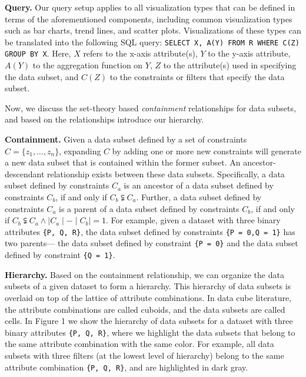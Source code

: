 \textbf{Query.} Our query setup applies to all visualization types that can be defined in terms of the aforementioned components, including common visualization types such as bar charts, trend lines, and scatter plots. Visualizations of these types can be translated into the following \textsc{SQL} query: {\tt SELECT X, A(Y) FROM R WHERE C(Z) GROUP BY X}. Here, $X$ refers to the x-axis attribute(s), $Y$ to the y-axis attribute, $A(Y)$ to the aggregation function on $Y$, $Z$ to the attribute(s) used in specifying the data subset, and $C(Z)$ to the constraints or filters that specify the data subset.

Now, we discuss the set-theory based \emph{containment} relationships for data subsets, and based on the relationships introduce our hierarchy.

\textbf{Containment.} Given a data subset defined by a set of constraints $C = \{z_1, \ldots, z_n\}$, expanding $C$ by adding one or more new constraints will generate a new data subset that is contained within the former subset. An ancestor-descendant relationship exists between these data subsets. Specifically, a data subset defined by constraints $C_a$ is an ancestor of a data subset defined by constraints $C_b$, if and only if $C_b \subsetneqq C_a$. Further, a data subset defined by constraints $C_a$ is a parent of a data subset defined by constraints $C_b$, if and only if $C_b \subsetneqq C_a \land \mid C_a \mid - \mid C_b \mid = 1$. For example, given a dataset with three binary attributes {\tt \{P, Q, R\}}, the data subset defined by constraints {\tt \{P = 0,Q = 1\}} has two parents--- the data subset defined by constraint {\tt \{P = 0\}} and the data subset defined by constraint {\tt \{Q = 1\}}.

\textbf{Hierarchy.} Based on the containment relationship, we can organize the data subsets of a given dataset to form a hierarchy. This hierarchy of data subsets is overlaid on top of the lattice of attribute combinations. In data cube literature, the attribute combinations are called cuboids, and the data subsets are called cells. In Figure 1 we show the hierarchy of data subsets for a dataset with three binary attributes {\tt \{P, Q, R\}}, where we highlight the data subsets that belong to the same attribute combination with the same color. For example, all data subsets with three filters (at the lowest level of hierarchy) belong to the same attribute combination {\tt \{P, Q, R\}}, and are highlighted in dark gray. 

